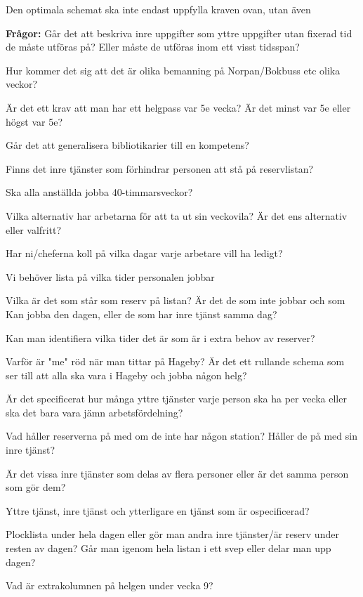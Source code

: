 Den optimala schemat ska inte endast uppfylla kraven ovan, utan även 

\textbf{Frågor:} Går det att beskriva inre uppgifter som yttre uppgifter utan fixerad tid de måste utföras på? Eller måste de utföras inom ett visst tidsspan?

Hur kommer det sig att det är olika bemanning på Norpan/Bokbuss etc olika veckor?

Är det ett krav att man har ett helgpass var 5e vecka? Är det minst var 5e eller högst var 5e?

Går det att generalisera bibliotikarier till en kompetens?

Finns det inre tjänster som förhindrar personen att stå på reservlistan?

Ska alla anställda jobba 40-timmarsveckor?

Vilka alternativ har arbetarna för att ta ut sin veckovila? Är det ens alternativ eller valfritt?

Har ni/cheferna koll på vilka dagar varje arbetare vill ha ledigt?

Vi behöver lista på vilka tider personalen jobbar

Vilka är det som står som reserv på listan? Är det de som inte jobbar och som Kan jobba den dagen, eller de som har inre tjänst samma dag?

Kan man identifiera vilka tider det är som är i extra behov av reserver?

Varför är "me" röd när man tittar på Hageby? Är det ett rullande schema som ser till att alla ska vara i Hageby och jobba någon helg?

Är det specificerat hur många yttre tjänster varje person ska ha per vecka eller ska det bara vara jämn arbetsfördelning?

Vad håller reserverna på med om de inte har någon station? Håller de på med sin inre tjänst?

Är det vissa inre tjänster som delas av flera personer eller är det samma person som gör dem?

Yttre tjänst, inre tjänst och ytterligare en tjänst som är ospecificerad?

Plocklista under hela dagen eller gör man andra inre tjänster/är reserv under resten av dagen? Går man igenom hela listan i ett svep eller delar man upp dagen?

Vad är extrakolumnen på helgen under vecka 9?